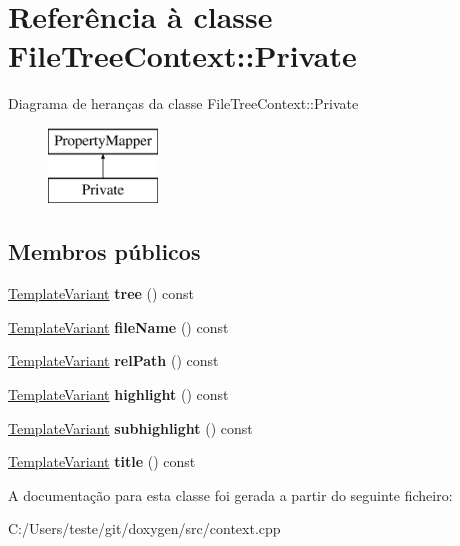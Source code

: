 \hypertarget{class_file_tree_context_1_1_private}{\section{Referência à classe File\-Tree\-Context\-:\-:Private}
\label{class_file_tree_context_1_1_private}
}
Diagrama de heranças da classe File\-Tree\-Context\-:\-:Private\begin{figure}[H]
\begin{center}
\leavevmode
\includegraphics[height=2.000000cm]{class_file_tree_context_1_1_private}
\end{center}
\end{figure}
\subsection*{Membros públicos}
\begin{DoxyCompactItemize}
\item 
\hypertarget{class_file_tree_context_1_1_private_a03a64bc77db8e7343cdb41781dc3f9a6}{\hyperlink{class_template_variant}{Template\-Variant} {\bfseries tree} () const }\label{class_file_tree_context_1_1_private_a03a64bc77db8e7343cdb41781dc3f9a6}

\item 
\hypertarget{class_file_tree_context_1_1_private_ae9e01c2e41d8bdd7446faf2a1ab28a44}{\hyperlink{class_template_variant}{Template\-Variant} {\bfseries file\-Name} () const }\label{class_file_tree_context_1_1_private_ae9e01c2e41d8bdd7446faf2a1ab28a44}

\item 
\hypertarget{class_file_tree_context_1_1_private_a68d3623b40481f2d31009257086699e4}{\hyperlink{class_template_variant}{Template\-Variant} {\bfseries rel\-Path} () const }\label{class_file_tree_context_1_1_private_a68d3623b40481f2d31009257086699e4}

\item 
\hypertarget{class_file_tree_context_1_1_private_ab088f4d955499ca1d67c286a117e5bfe}{\hyperlink{class_template_variant}{Template\-Variant} {\bfseries highlight} () const }\label{class_file_tree_context_1_1_private_ab088f4d955499ca1d67c286a117e5bfe}

\item 
\hypertarget{class_file_tree_context_1_1_private_ade53cb2b5272274e0736e78a27b75c5b}{\hyperlink{class_template_variant}{Template\-Variant} {\bfseries subhighlight} () const }\label{class_file_tree_context_1_1_private_ade53cb2b5272274e0736e78a27b75c5b}

\item 
\hypertarget{class_file_tree_context_1_1_private_a5732df72750a31555da8a10f5788ef02}{\hyperlink{class_template_variant}{Template\-Variant} {\bfseries title} () const }\label{class_file_tree_context_1_1_private_a5732df72750a31555da8a10f5788ef02}

\end{DoxyCompactItemize}


A documentação para esta classe foi gerada a partir do seguinte ficheiro\-:\begin{DoxyCompactItemize}
\item 
C\-:/\-Users/teste/git/doxygen/src/context.\-cpp\end{DoxyCompactItemize}
